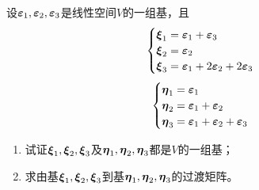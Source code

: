 \begin{problem}
设\(\vecveps_1,\vecveps_2,\vecveps_3\)是线性空间\(V\)的一组基，且
\begin{equation*}
    \begin{cases}
        \vecxi_1=\vecveps_1+\vecveps_3 \\
        \vecxi_2=\vecveps_2            \\
        \vecxi_3=\vecveps_1+2\vecveps_2+2\vecveps_3
    \end{cases}
\end{equation*}
\begin{equation*}
    \begin{cases}
        \veceta_1=\vecveps_1            \\
        \veceta_2=\vecveps_1+\vecveps_2 \\
        \veceta_3=\vecveps_1+\vecveps_2+\vecveps_3
    \end{cases}
\end{equation*}
\begin{enumerate}
    \item 试证\(\vecxi_1,\vecxi_2,\vecxi_3\)及\(\veceta_1,\veceta_2,\veceta_3\)都是\(V\)的一组基；
    \item 求由基\(\vecxi_1,\vecxi_2,\vecxi_3\)到基\(\veceta_1,\veceta_2,\veceta_3\)的过渡矩阵。
\end{enumerate}
\end{problem}
